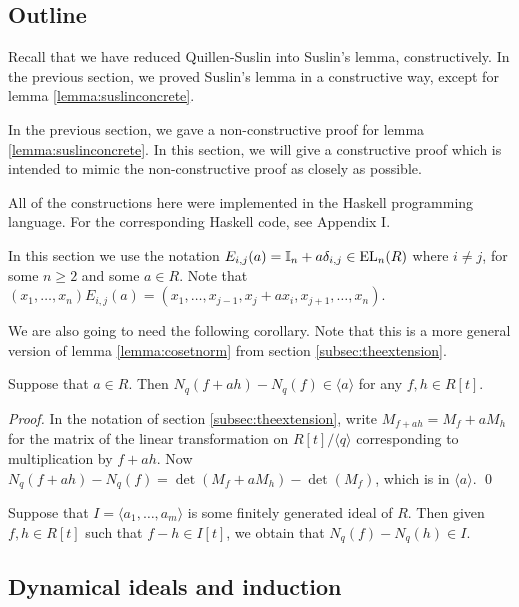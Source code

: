 \subsection{Outline}
Recall that we have reduced Quillen-Suslin into Suslin's lemma, constructively.
In the previous section, we proved Suslin's lemma in a constructive way, except for lemma \ref{lemma:suslinconcrete}.

In the previous section, we gave a non-constructive proof for lemma \ref{lemma:suslinconcrete}.
In this section, we will give a constructive proof which is intended to mimic the non-constructive proof as closely as possible.

All of the constructions here were implemented in the Haskell programming language.
For the corresponding Haskell code, see Appendix I.

\begin{notation}
  In this section we use the notation
  $E_{i,j}(a) = \mathbb{I}_n + a\delta_{i,j} \in \text{EL}_n(R)$ where $i \neq j$, for some $n \geq 2$ and some $a \in R$.
  Note that $(x_1, \dots, x_n) E_{i,j}(a) = (x_1, \dots, x_{j-1}, x_j + a x_i, x_{j+1}, \dots, x_n)$.
\end{notation}

We are also going to need the following corollary.
Note that this is a more general version of lemma \ref{lemma:cosetnorm} from section \ref{subsec:theextension}.

\begin{lemma}
  Suppose that $a \in R$.
  Then $N_q(f + ah) - N_q(f) \in \langle a \rangle$ for any $f,h\in R[t]$.
\end{lemma}
\begin{proof}
  In the notation of section \ref{subsec:theextension}, write $M_{f+ah} = M_f + a M_h$ for the matrix of the linear transformation on
  $R[t]/\langle q \rangle$ corresponding to multiplication by $f + ah$.
  Now $N_q(f + ah) - N_q(f) = \det (M_f + aM_h) - \det(M_f)$, which is in $\langle a \rangle$.
  \qed
\end{proof}

\begin{corollary}\label{cor:idealnorm}
  Suppose that $I = \langle a_1,\dots,a_m\rangle$ is some finitely generated ideal of $R$.
  Then given $f,h\in R[t]$ such that $f - h \in I[t]$, we obtain that
  $N_q(f) - N_q(h) \in I$.
\end{corollary}

\subsection{Dynamical ideals and induction}

